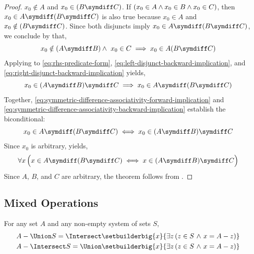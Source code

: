 \begin{proof}
    \( x_{0} \notin A \) and \( x_{0} \in \mleft( B \symdiff C \mright) \).
    If \( \mleft( x_{0} \in A \land x_{0} \in B \land x_{0} \in C \mright) \), then
    \( x_{0} \in A \symdiff \mleft( B \symdiff C \mright) \) is also true because \( x_{0} \in A \)
    and \( x_{0} \notin \mleft( B \symdiff C \mright) \). Since both disjuncts imply \( x_{0} \in
    A \symdiff \mleft( B \symdiff C \mright)\), we conclude by  that,
    \begin{equation}
        \label{eq:right-disjunct-backward-implication}
        x_{0} \notin \mleft( A \symdiff B \mright) \land \,\, x_{0} \in C
        \implies
        x_{0} \in A \mleft( B \symdiff C \mright)
    \end{equation}
    Applying  to \eqref{eq:rhs-predicate-form}, \eqref{eq:left-disjunct-backward-implication},
    and \eqref{eq:right-disjunct-backward-implication} yields,
    \begin{equation}
        \label{eq:symmetric-difference-associativity-backward-implication}
        x_{0} \in \mleft( A \symdiff B \mright) \symdiff C
        \implies
        x_{0} \in A \symdiff \mleft( B \symdiff C \mright)
    \end{equation}
    Together, \eqref{eq:symmetric-difference-associativity-forward-implication} and \eqref{eq:symmetric-difference-associativity-backward-implication}
    establish the biconditional:
    \begin{equation*}
        x_{0} \in A \symdiff \mleft( B \symdiff C \mright)
        \iff
        x_{0} \in \mleft( A \symdiff B \mright) \symdiff C
    \end{equation*}
    Since \( x_{0} \) is arbitrary,  yields,
    \begin{equation*}
        \forall x \, \Big( x \in A \symdiff \mleft( B \symdiff C \mright)
        \iff
        x \in \mleft( A \symdiff B \mright) \symdiff C
        \Big)
    \end{equation*}
    Since \( A \), \( B \), and \( C \) are arbitrary, the theorem follows from
    .
\end{proof}
\subsection{Mixed Operations}
\begin{thm}
    \label{set-identities:generalized-de-morgan-laws}
    For any set \( A \) and any non-empty system of sets \( S \),
    \begin{gather*}
        A - \Union S =
        \Intersect \setbuilderbig{x}{\exists z \, \mleft( z \in S \,\,{\land}\,\, x = A - z \mright)}\\
        A - \Intersect S =
        \Union \setbuilderbig{x}{\exists z \, \mleft( z \in S \,\,{\land}\,\, x = A - z \mright)}
    \end{gather*}
\end{thm}


